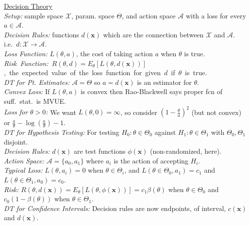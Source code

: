 \documentclass[11pt]{article}
\newcommand{\vecx}{\ensuremath{\mathbf{x}}}
\newcommand{\sam}{\ensuremath{\mathcal{X}}} %
\newcommand{\act}{\ensuremath{\mathcal{A}}} %
\begin{document}
\indent\underline{Decision Theory}\\
{\it Setup:} sample space $\sam$, param. space $\Theta$, and action space $\act$ with
 a loss for every $a \in \act$.\\
%
{\it Decision Rules:} functions $d(\vecx)$  which are the connection between \sam{}
and \act .  i.e.\ $d:\sam\longrightarrow\act$.\\
%
{\it Loss Function:} $L(\theta, a)$, the cost of taking action $a$ when $\theta $ is true.\\
%
\mbox{{\it Risk Function:}  $R(\theta , d) = E_\theta [L(\theta, d(\vecx))]$, the expected
value of the loss function for given $d$ if $\theta$ is true.}\\
%
{\it DT for Pt. Estimates:} $\act = \Theta$ so $a = d(\vecx)$ is an estimator for $\theta$.\\ 
\hspace*{1.5em}\textsl{Convex Loss:} If $L(\theta, a)$ is convex then Rao-Blackwell says
proper fcn of suff.\ stat.\ is MVUE.\\
%
\hspace*{1.5em}\textsl{Loss for $\theta > 0$:} We want $L(\theta, 0) = \infty$, so consider
$(1-\frac{\theta}{a})^2$ (but not convex) or $\frac{a}{\theta} - \log(\frac{a}{\theta}) - 1.$\\
%
{\it DT for Hypothesis Testing:} For testing $H_0: \theta \in \Theta_0$ against $H_1:
\theta \in \Theta_1$ with $\Theta_0,\Theta_1$ disjoint.\\
%
\hspace*{1.5em}\textsl{Decision Rules:} $d(\vecx)$ are test functions $\phi(\vecx)$
(non-randomized, here).\\
%
\hspace*{1.5em}\textsl{Action Space:} $\act =\{a_0,a_1\}$ where $a_i$ is the action of
accepting $H_i$.\\
%
\hspace*{1.5em}\textsl{Typical Loss:} $L(\theta, a_i) = 0$ when $\theta\in\Theta_i$, and
$L(\theta\in\Theta_0,a_1) = c_1$ and $L(\theta\in\Theta_1,a_0) = c_0$.\\
%
\hspace*{1.5em}\textsl{Risk:} $R(\theta,d(\vecx)) = 
E_\theta[L(\theta,\phi(\vecx))] = c_1\beta(\theta)$ when $\theta\in\Theta_0$ and
$c_0(1-\beta(\theta))$ when $\theta\in \Theta_1$.\\
%
{\it DT for Confidence Intervals:} Decision rules are now endpoints, of interval, $c(\vecx)$ and
$d(\vecx)$.\\
\end{document}
